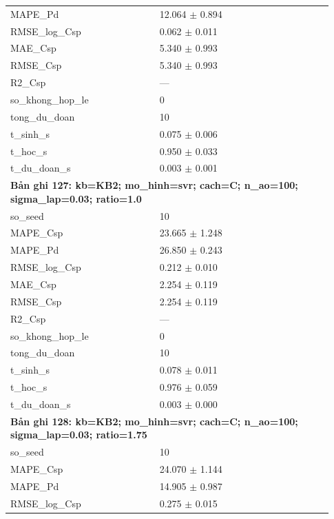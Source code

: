 \begin{longtable}{p{0.43\linewidth}p{0.50\linewidth}}
MAPE\_\allowbreak Pd & 12.064 $\pm$ 0.894 \\
RMSE\_\allowbreak log\_\allowbreak Csp & 0.062 $\pm$ 0.011 \\
MAE\_\allowbreak Csp & 5.340 $\pm$ 0.993 \\
RMSE\_\allowbreak Csp & 5.340 $\pm$ 0.993 \\
R2\_\allowbreak Csp & — \\
so\_\allowbreak khong\_\allowbreak hop\_\allowbreak le & 0 \\
tong\_\allowbreak du\_\allowbreak doan & 10 \\
t\_\allowbreak sinh\_\allowbreak s & 0.075 $\pm$ 0.006 \\
t\_\allowbreak hoc\_\allowbreak s & 0.950 $\pm$ 0.033 \\
t\_\allowbreak du\_\allowbreak doan\_\allowbreak s & 0.003 $\pm$ 0.001 \\
\midrule
\multicolumn{2}{p{0.95\linewidth}}{\textbf{Bản ghi 127: kb=KB2; mo\_hinh=svr; cach=C; n\_ao=100; sigma\_lap=0.03; ratio=1.0}} \\
so\_\allowbreak seed & 10 \\
MAPE\_\allowbreak Csp & 23.665 $\pm$ 1.248 \\
MAPE\_\allowbreak Pd & 26.850 $\pm$ 0.243 \\
RMSE\_\allowbreak log\_\allowbreak Csp & 0.212 $\pm$ 0.010 \\
MAE\_\allowbreak Csp & 2.254 $\pm$ 0.119 \\
RMSE\_\allowbreak Csp & 2.254 $\pm$ 0.119 \\
R2\_\allowbreak Csp & — \\
so\_\allowbreak khong\_\allowbreak hop\_\allowbreak le & 0 \\
tong\_\allowbreak du\_\allowbreak doan & 10 \\
t\_\allowbreak sinh\_\allowbreak s & 0.078 $\pm$ 0.011 \\
t\_\allowbreak hoc\_\allowbreak s & 0.976 $\pm$ 0.059 \\
t\_\allowbreak du\_\allowbreak doan\_\allowbreak s & 0.003 $\pm$ 0.000 \\
\midrule
\multicolumn{2}{p{0.95\linewidth}}{\textbf{Bản ghi 128: kb=KB2; mo\_hinh=svr; cach=C; n\_ao=100; sigma\_lap=0.03; ratio=1.75}} \\
so\_\allowbreak seed & 10 \\
MAPE\_\allowbreak Csp & 24.070 $\pm$ 1.144 \\
MAPE\_\allowbreak Pd & 14.905 $\pm$ 0.987 \\
RMSE\_\allowbreak log\_\allowbreak Csp & 0.275 $\pm$ 0.015 \\

\end{longtable}
